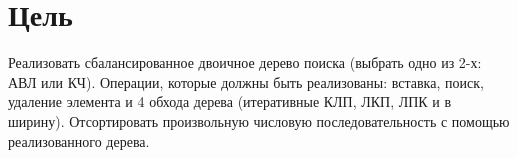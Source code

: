 
\section{Цель}

Реализовать сбалансированное двоичное дерево поиска
(выбрать одно из 2-х: АВЛ или КЧ). Операции, которые должны быть реализованы:
вставка, поиск, удаление элемента и 4 обхода дерева (итеративные КЛП, ЛКП,
ЛПК и в ширину). Отсортировать произвольную числовую последовательность с
помощью реализованного дерева.
